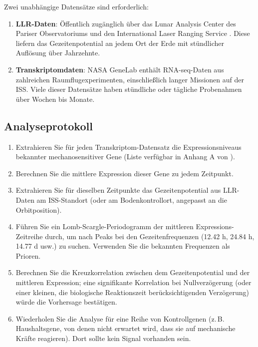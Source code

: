 \documentclass[12pt,a4paper]{article}
\theoremstyle{remark}
\begin{document}
	Zwei unabhängige Datensätze sind erforderlich:
	
	\begin{enumerate}
		\item \textbf{LLR-Daten}: Öffentlich zugänglich über das Lunar Analysis Center des Pariser Observatoriums \cite{LLR-POLAC} und den International Laser Ranging Service \cite{ILRS}. Diese liefern das Gezeitenpotential an jedem Ort der Erde mit stündlicher Auflösung über Jahrzehnte.
		\item \textbf{Transkriptomdaten}: NASA GeneLab \cite{NASA-GeneLab} enthält RNA-seq-Daten aus zahlreichen Raumflugexperimenten, einschließlich langer Missionen auf der ISS. Viele dieser Datensätze haben stündliche oder tägliche Probenahmen über Wochen bis Monate.
	\end{enumerate}
	
	\subsection{Analyseprotokoll}
	
	\begin{enumerate}
		\item Extrahieren Sie für jeden Transkriptom-Datensatz die Expressionsniveaus bekannter mechanosensitiver Gene (Liste verfügbar in Anhang A von \cite{NASA-GeneLab}).
		\item Berechnen Sie die mittlere Expression dieser Gene zu jedem Zeitpunkt.
		\item Extrahieren Sie für dieselben Zeitpunkte das Gezeitenpotential aus LLR-Daten am ISS-Standort (oder am Bodenkontrollort, angepasst an die Orbitposition).
		\item Führen Sie ein Lomb-Scargle-Periodogramm der mittleren Expressions-Zeitreihe durch, um nach Peaks bei den Gezeitenfrequenzen (12.42 h, 24.84 h, 14.77 d usw.) zu suchen. Verwenden Sie die bekannten Frequenzen als Prioren.
		\item Berechnen Sie die Kreuzkorrelation zwischen dem Gezeitenpotential und der mittleren Expression; eine signifikante Korrelation bei Nullverzögerung (oder einer kleinen, die biologische Reaktionszeit berücksichtigenden Verzögerung) würde die Vorhersage bestätigen.
		\item Wiederholen Sie die Analyse für eine Reihe von Kontrollgenen (z. B. Haushaltsgene, von denen nicht erwartet wird, dass sie auf mechanische Kräfte reagieren). Dort sollte kein Signal vorhanden sein.
	\end{enumerate}
	
\end{document}
